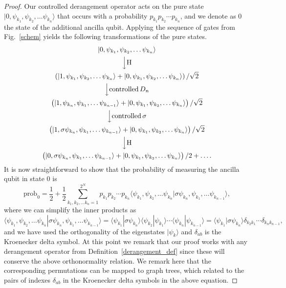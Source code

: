 \documentclass[aps,prx,showpacs,twocolumn,reprint]{revtex4-2}
\newcommand{\perm}{D_n}
\begin{document}
{\begin{proof}
	Our controlled derangement operator acts on the pure state $|0,\psi_{k_1}, \psi_{k_2},  \dots \psi_{k_n} \rangle$
	that occurs with a probability $p_{k_1}p_{k_2}\cdots p_{k_n}$, and we denote as $0$ the state of the additional ancilla qubit.
	Applying the sequence of gates from Fig.~\ref{schem} yields the following transformations of the pure states.
\begin{gather*}
|0,\psi_{k_1}, \psi_{k_2},  \dots \psi_{k_n} \rangle\\
 \Big\downarrow \mathrm{H}\\
\left( |1,\psi_{k_1}, \psi_{k_2},  \dots \psi_{k_n} \rangle + |0,\psi_{k_1}, \psi_{k_2},  \dots \psi_{k_n} \rangle \right)/\sqrt{2}\\
 \Big\downarrow \mathrm{controlled} \, \perm\\
\left(|1,\psi_{k_n}, \psi_{k_1},  \dots \psi_{k_{n-1}} \rangle + |0,\psi_{k_1}, \psi_{k_2},  \dots \psi_{k_n} \rangle \right)/\sqrt{2}\\
 \Big\downarrow \mathrm{controlled} \, \sigma\\
\left(|1,\sigma \psi_{k_n}, \psi_{k_1},  \dots \psi_{k_{n-1}} \rangle + |0,\psi_{k_1}, \psi_{k_2},  \dots \psi_{k_n} \rangle \right)/\sqrt{2}\\
  \Big\downarrow \mathrm{H}\\
 \left(|0,\sigma \psi_{k_n}, \psi_{k_1},  \dots \psi_{k_{n-1}} \rangle + |0,\psi_{k_1}, \psi_{k_2},  \dots \psi_{k_n} \rangle \right)/2
 + \dots.
\end{gather*}
	It is now straightforward to show that the probability of
	measuring the ancilla qubit in state 0 is
	\begin{equation}
	\mathrm{prob}_0 = \frac{1}{2} + \frac{1}{2} \sum_{k_1,k_2,\dots k_n=1}^{2^N} p_{k_1}p_{k_2}\cdots p_{k_n} 
	\langle \psi_{k_1}, \psi_{k_2},  \dots \psi_{k_n}	| \sigma \psi_{k_n}, \psi_{k_1},  \dots \psi_{k_{n-1}} \rangle,
	\end{equation}
	where we can simplify the inner products as
	\begin{equation} \label{orthogonality}
	\langle \psi_{k_1}, \psi_{k_2},  \dots \psi_{k_n}	| \sigma \psi_{k_n}, \psi_{k_1},  \dots \psi_{k_{n-1}} \rangle
	=\langle\psi_{k_1} |\sigma \psi_{k_n} \rangle \langle  \psi_{k_2} | \psi_{k_1} \rangle \cdots \langle \psi_{k_n} | \psi_{k_{n-1}} \rangle
	=\langle\psi_{k_1} |\sigma \psi_{k_n} \rangle \delta_{{k_2} {k_1}} \cdots \delta_{{k_n} {k_{n-1}}},
	\end{equation}
	and we have used the orthogonality of the eigenstates $| \psi_{k} \rangle$ and $\delta_{a b}$ is
	the Kroenecker delta symbol.
	At this point we remark that our proof works with any derangement operator from Definition~\ref{derangement_def}
	since these will conserve the above orthonormality relation. We remark here that the corresponding permutations
	can be mapped to graph trees, which related to the pairs of indexes $\delta_{a b}$ in the
	Kroenecker delta symbols in the above equation.


\end{proof}}
\end{document}
